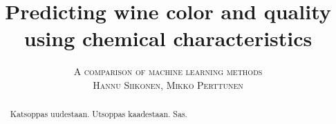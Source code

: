 \documentclass[twoside]{article}
\title{\vspace{-15mm}\fontsize{24pt}{10pt}\selectfont\textbf{Predicting wine color and quality using chemical characteristics}}
\author{
\large
\textsc{A comparison of machine learning methods}\\[2mm]
\textsc{Hannu Siikonen, Mikko Perttunen}\\[2mm]
\vspace{-5mm}
}
\date{}
\begin{document}
\maketitle %


\begin{abstract}

\noindent Katsoppas uudestaan. Utsoppas kaadestaan. Sas.

\end{abstract}

\end{document}
